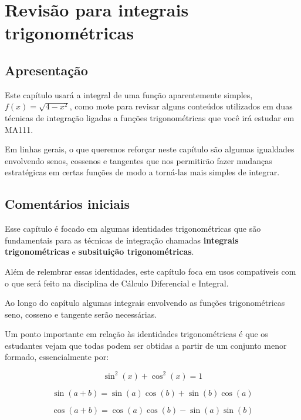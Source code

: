 \documentclass[main_estudante.tex]{subfiles}
\begin{document}
\paraAmbos

\chapter{Revisão para integrais trigonométricas}

\paraAlunos

\section{Apresentação}

Este capítulo usará a integral de uma função aparentemente simples, $f(x)=\sqrt{4-x^2}$, como mote para revisar alguns conteúdos utilizados em duas técnicas de integração ligadas a funções trigonométricas que você irá estudar em MA111.

Em linhas gerais, o que queremos reforçar neste capítulo são algumas igualdades envolvendo senos, cossenos e tangentes que nos permitirão fazer mudanças estratégicas em certas funções de modo a torná-las mais simples de integrar.

\paraTutores

\section{Comentários iniciais}

Esse capítulo é focado em algumas identidades trigonométricas que são fundamentais para as técnicas de integração chamadas \textbf{integrais trigonométricas} e \textbf{subsituição trigonométricas}.

Além de relembrar essas identidades, este capítulo foca em usos compatíveis com o que será feito na disciplina de Cálculo Diferencial e Integral.

Ao longo do capítulo algumas integrais envolvendo as funções trigonométricas seno, cosseno e tangente serão necessárias.

Um ponto importante em relação às identidades trigonométricas é que os estudantes vejam que todas podem ser obtidas a partir de um conjunto menor formado, essencialmente por:

$$\sin^2(x)+\cos^2(x)=1$$

$$\sin(a+b)=\sin(a)\cos(b)+\sin(b)\cos(a)$$

$$\cos(a+b)=\cos(a)\cos(b)-\sin(a)\sin(b) $$
\end{document}
